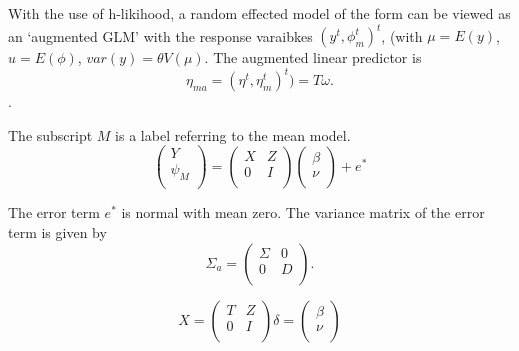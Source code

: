 \documentclass[Main.tex]{subfiles}
\begin{document}
With the use of h-likihood, a random effected model of the form can be viewed as an `augmented GLM' with the response varaibkes $(y^t, \phi^t_m)^t$, (with $\mu = E(y)$,$ u = E(\phi)$, $var(y) = \theta V (\mu)$.
The augmented linear predictor is \[\eta_{ma}  = (\eta^t, \eta^t_m)^t) = T\omega. \].




The subscript $M$ is a label referring to the mean model.
\begin{equation}
\left(%
\begin{array}{c}
Y \\
\psi_{M} \\
\end{array}%
\right) = \left(
\begin{array}{cc}
X & Z \\
0 & I \\
\end{array}\right) \left(%
\begin{array}{c}
\beta \\
\nu \\
\end{array}%
\right)+ e^{*}
\end{equation}




The error term $e^{*}$ is normal with mean zero. The variance matrix of the error term is given by
\begin{equation}
\Sigma_{a} = \left(%
\begin{array}{cc}
\Sigma & 0 \\
0 & D \\
\end{array}%
\right).
\end{equation}


\begin{equation}
X = \left(%
\begin{array}{cc}
T & Z \\
0 & I \\
\end{array}%
\right)
\delta = \left(%
\begin{array}{c}
\beta  \\
\nu  \\
\end{array}%
\right)
\end{equation}
\end{document}
